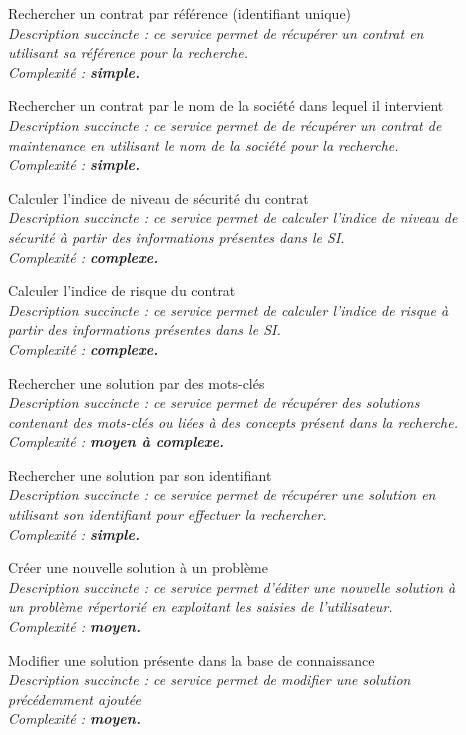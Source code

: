 \begin{description}
    \item[\textbullet] Rechercher un contrat par référence (identifiant unique) \\
        \it{Description succincte :} ce service permet de récupérer un contrat en utilisant sa référence pour la recherche. \\
        \it{Complexité :} \bf{simple}.
    \item[\textbullet] Rechercher un contrat par le nom de la société dans lequel il intervient \\
        \it{Description succincte :} ce service permet de de récupérer un contrat de maintenance en utilisant le nom de la société pour la recherche. \\
        \it{Complexité :} \bf{simple}.
    \item[\textbullet] Calculer l’indice de niveau de sécurité du contrat \\
        \it{Description succincte :} ce service permet de calculer l’indice de niveau de sécurité à partir des informations présentes dans le SI. \\
        \it{Complexité :} \bf{complexe}.
    \item[\textbullet] Calculer l’indice de risque du contrat \\
        \it{Description succincte :} ce service permet de calculer l’indice de risque à partir des informations présentes dans le SI. \\
        \it{Complexité :} \bf{complexe}.
    \item[\textbullet] Rechercher une solution par des mots-clés \\
        \it{Description succincte :} ce service permet de récupérer des solutions contenant des mots-clés ou liées à des concepts présent dans la recherche. \\
        \it{Complexité :} \bf{moyen} à \bf{complexe}.
    \item[\textbullet] Rechercher une solution par son identifiant \\
        \it{Description succincte :} ce service permet de récupérer une solution en utilisant son identifiant pour effectuer la rechercher. \\
        \it{Complexité :} \bf{simple}.
    \item[\textbullet] Créer une nouvelle solution à un problème \\
        \it{Description succincte :} ce service permet d’éditer une nouvelle solution à un problème répertorié en exploitant les saisies de l’utilisateur. \\
        \it{Complexité :} \bf{moyen}.
    \item[\textbullet] Modifier une solution présente dans la base de connaissance \\
        \it{Description succincte :} ce service permet de modifier une solution précédemment ajoutée \\
        \it{Complexité :} \bf{moyen}.
\end{description}

